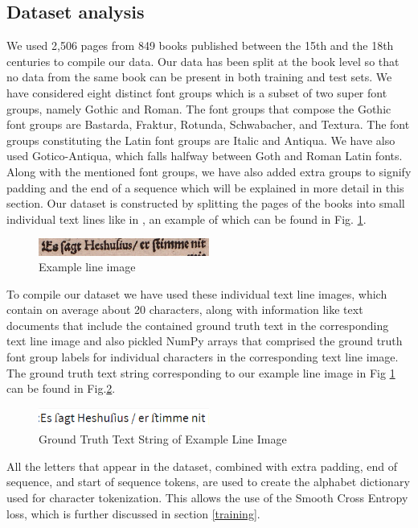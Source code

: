 \documentclass[conference]{IEEEtran}
\begin{document}
\subsection{Dataset analysis}
We used 2,506 pages from 849 books published between the 15th and the 18th centuries to compile our data. Our data has been split at the book level so that no data from the same book can be present in both training and test sets. We have considered eight distinct font groups which is a subset of two super font groups, namely Gothic and Roman. The font groups that compose the Gothic font groups are Bastarda, Fraktur, Rotunda, Schwabacher, and Textura. The font groups constituting the Latin font groups are Italic and Antiqua. We have also used Gotico-Antiqua, which falls halfway between Goth and Roman Latin fonts. Along with the mentioned font groups, we have also added extra groups to signify padding and the end of a sequence which will be explained in more detail in this section. Our dataset is constructed by splitting the pages of the books into small individual text lines like in \cite{faucris.312972480}, an example of which can be found in Fig. \ref{example}.\newline
\begin{figure}[htbp]
    \centering
    \includegraphics[width=0.5\textwidth]{figures/Example_Line_image.jpg}
    \caption{Example line image}
    \label{example}
\end{figure}\newline
To compile our dataset we have used these individual text line images, which contain on average about 20 characters, along with information like text documents that include the contained ground truth text in the corresponding text line image and also pickled NumPy arrays that comprised the ground truth font group labels for individual characters in the corresponding text line image. The ground truth text string corresponding to our example line image in Fig \ref{example} can be found in Fig.\ref{GT}. 
\begin{figure}[htbp]
    \centering
    \includegraphics[width=0.5\textwidth]{figures/GTText.png}
    \caption{Ground Truth Text String of Example Line Image}
    \label{GT}
\end{figure}\newline
All the letters that appear in the dataset, combined with extra padding, end of sequence, and start of sequence tokens, are used to create the alphabet dictionary used for character tokenization. This allows the use of the Smooth Cross Entropy loss, which is further discussed in section \ref{training}.
\end{document}
